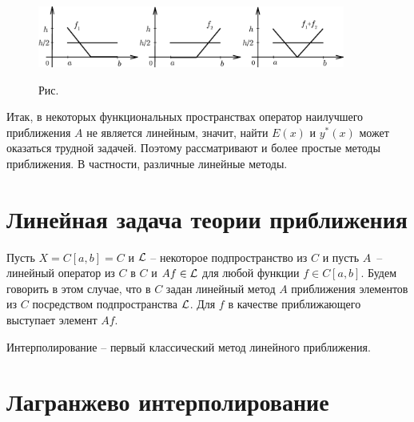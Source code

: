 
\begin{figure}[ht]
\begin{center}
\includegraphics[width=0.9\textwidth]{pict01-3.eps}
\end{center}
 \bigskip
 \label{r1-3}

 \centerline{Рис.~\theris}
 \bigskip
\end{figure}





Итак, в некоторых функциональных пространствах {оператор наилучшего} {приближения}
$A$ не является линейным, значит,
{найти} $E{(x)}$ и $y^*{(x)}$ {может} {оказаться трудной задачей. Поэтому рассматривают и
более простые методы} {приближения. В частности, различные линейные методы.}

\section{Линейная задача теории приближения}

Пусть $X=C[a,b]=C$ и $\mathcal{L}$ -- некоторое {подпространство} из $C$ и пусть $A$~--
линейный оператор из $C$ в $C$ и {$Af \in \mathcal{L}$} для любой функции $f \in C[a,b].$
Будем говорить в этом случае, что в $C$ задан линейный метод $A$ приближения элементов
{из} $C$ посредством подпространства $\mathcal{L}$. {Для $f$ в качестве приближающего
выступает элемент $Af$.}

Интерполирование -- первый классический метод линейного приближения.

\section{Лагранжево интерполирование}

